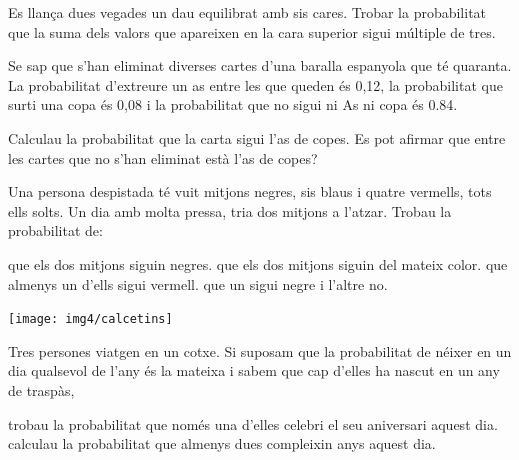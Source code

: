 \begin{mylist}
\exer  Es llança dues vegades un dau equilibrat amb sis cares. Trobar la probabilitat que la suma dels valors que apareixen en la cara superior sigui múltiple de tres. 
  

 \exer \hot Se sap que s'han eliminat diverses cartes d'una baralla espanyola que té quaranta. La  probabilitat d'extreure un as entre les que queden és 0,12, la probabilitat que surti una copa és 0,08 i la probabilitat que no sigui ni As ni copa és 0.84. 

 Calculau la probabilitat que la carta sigui l'as de copes. Es pot afirmar que entre les cartes que no s'han eliminat està l'as de copes?
 

\exer[1] Una persona despistada té vuit mitjons negres, sis blaus i quatre vermells, tots ells solts. Un dia amb molta pressa, tria dos mitjons a l'atzar. Trobau la probabilitat de:  

\begin{minipage}{0.65\textwidth}	
	\begin{tasks}
		\task  que els dos mitjons siguin negres. 
		\task  que els dos mitjons siguin del mateix color.
		\task  que  almenys un d'ells sigui vermell.
		\task  que un sigui negre i l'altre no.
	\end{tasks}
\end{minipage}
\begin{minipage}{0.29\textwidth}
	\centering
	\texttt{[image: img4/calcetins]}
\end{minipage}

 

 \exer Tres persones viatgen en un cotxe. Si suposam que la probabilitat de néixer en un dia qualsevol de l'any és la mateixa i sabem que cap d'elles ha nascut en un any de traspàs, 
\begin{tasks}
	\task  trobau la probabilitat que només una d'elles celebri el seu aniversari aquest dia.
	\task  calculau la probabilitat que almenys dues compleixin anys aquest dia.
\end{tasks}
\answers[cols=1]{[$3\left(\dfrac{1}{365}\right)\left(\dfrac{364}{365}\right)^2 = 0,008174203184$, 
  $3 \left(\dfrac{1}{365}\right)^2 \left(\dfrac{364}{365}\right)+ \left(\dfrac{1}{365}\right)^3 = 0,000022456602$
 ]}
\end{mylist}

